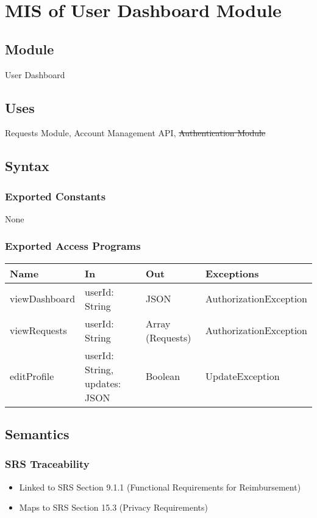 \documentclass[12pt, titlepage]{article}
\begin{document}
\section{MIS of User Dashboard Module} \label{UserDashboard} \subsection{Module} User Dashboard

\subsection{Uses}
Requests Module, Account Management API, \st{Authentication Module}

\subsection{Syntax}

\subsubsection{Exported Constants}
None

\subsubsection{Exported Access Programs}
\begin{center}
\begin{tabular}{p{4cm} p{4cm} p{4cm} p{2cm}}
\hline
\textbf{Name} & \textbf{In} & \textbf{Out} & \textbf{Exceptions} \\
\hline
viewDashboard & userId: String & JSON & AuthorizationException \\
viewRequests & userId: String & Array (Requests) & AuthorizationException \\
editProfile & userId: String, updates: JSON & Boolean & UpdateException \\
\hline
\end{tabular}
\end{center}

\subsection{Semantics}

\subsubsection{SRS Traceability}
\begin{itemize}
  \item Linked to SRS Section 9.1.1 (Functional Requirements for Reimbursement)
  \item Maps to SRS Section 15.3 (Privacy Requirements)
\end{itemize}
\end{document}
